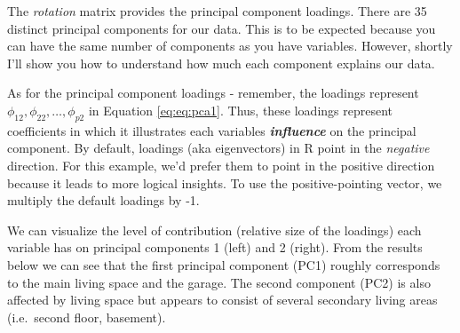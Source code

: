 \documentclass[]{book}
\newenvironment{Shaded}{\begin{snugshade}}{\end{snugshade}}
\newcommand{\CommentTok}[1]{\textcolor[rgb]{0.56,0.35,0.01}{\textit{#1}}}
\newcommand{\DecValTok}[1]{\textcolor[rgb]{0.00,0.00,0.81}{#1}}
\newcommand{\NormalTok}[1]{#1}
\newcommand{\OperatorTok}[1]{\textcolor[rgb]{0.81,0.36,0.00}{\textbf{#1}}}
\newcommand{\StringTok}[1]{\textcolor[rgb]{0.31,0.60,0.02}{#1}}
\theoremstyle{definition}
\theoremstyle{definition}
\theoremstyle{definition}
\theoremstyle{remark}
\begin{document}
The \emph{rotation} matrix provides the principal component loadings.
There are 35 distinct principal components for our data. This is to be
expected because you can have the same number of components as you have
variables. However, shortly I'll show you how to understand how much
each component explains our data.

As for the principal component loadings - remember, the loadings
represent \(\phi_{12}, \phi_{22},\dots,\phi_{p2}\) in Equation
\eqref{eq:eq:pca1}. Thus, these loadings represent coefficients in which
it illustrates each variables \textbf{\emph{influence}} on the principal
component. By default, loadings (aka eigenvectors) in R point in the
\emph{negative} direction. For this example, we'd prefer them to point
in the positive direction because it leads to more logical insights. To
use the positive-pointing vector, we multiply the default loadings by
-1.

\begin{Shaded}
\end{Shaded}

We can visualize the level of contribution (relative size of the
loadings) each variable has on principal components 1 (left) and 2
(right). From the results below we can see that the first principal
component (PC1) roughly corresponds to the main living space and the
garage. The second component (PC2) is also affected by living space but
appears to consist of several secondary living areas (i.e.~second floor,
basement).
\end{document}
